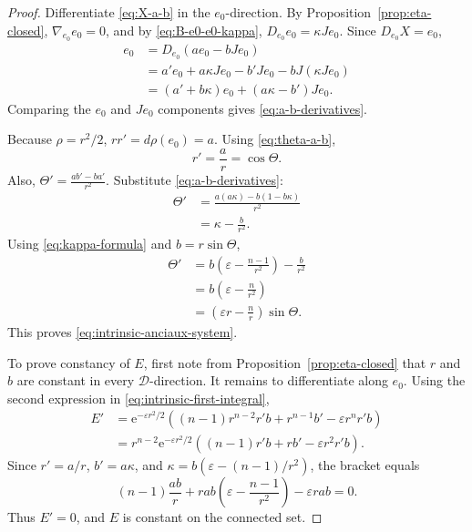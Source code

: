 \documentclass[11pt,a4paper]{article}
\numberwithin{equation}{section}
\newcommand{\Dcal}{\mathcal D}
\newcommand{\ee}{\mathrm e}
\begin{document}
\begin{proof}
Differentiate \eqref{eq:X-a-b} in the $e_0$-direction.  By Proposition~\ref{prop:eta-closed}, $\nabla_{e_0}e_0=0$, and by \eqref{eq:B-e0-e0-kappa},
$D_{e_0}e_0=\kappa Je_0.$
Since $D_{e_0}X=e_0$,
$$
\begin{aligned}
        e_0
        &=D_{e_0}(a e_0-bJe_0)\\
        &=a'e_0+a\kappa Je_0-b'Je_0-bJ(\kappa Je_0)\\
        &=(a'+b\kappa)e_0+(a\kappa-b')Je_0.
\end{aligned}
$$
Comparing the $e_0$ and $Je_0$ components gives \eqref{eq:a-b-derivatives}.

Because $\rho=r^2/2$,
$rr'=d\rho(e_0)=a.$
Using \eqref{eq:theta-a-b},
\begin{equation*}
        r'=\frac ar=\cos\Theta.
\end{equation*}
Also,
$\Theta'=\frac{ab'-ba'}{r^2}.$
Substitute \eqref{eq:a-b-derivatives}:
$$
\begin{aligned}
        \Theta'
        &=\frac{a(a\kappa)-b(1-b\kappa)}{r^2}\\
        &=\kappa-\frac{b}{r^2}.
\end{aligned}
$$
Using \eqref{eq:kappa-formula} and $b=r\sin\Theta$,
$$
\begin{aligned}
        \Theta'
        &=b\left(\varepsilon-\frac{n-1}{r^2}\right)-\frac{b}{r^2}\\
        &=b\left(\varepsilon-\frac n{r^2}\right)\\
        &=\left(\varepsilon r-\frac nr\right)\sin\Theta.
\end{aligned}
$$
This proves \eqref{eq:intrinsic-anciaux-system}.

To prove constancy of $E$, first note from Proposition~\ref{prop:eta-closed} that $r$ and $b$ are constant in every $\Dcal$-direction.  It remains to differentiate along $e_0$.  Using the second expression in \eqref{eq:intrinsic-first-integral},
$$
\begin{aligned}
        E'
        &=\ee^{-\varepsilon r^2/2}\left((n-1)r^{n-2}r'b+r^{n-1}b'-\varepsilon r^nr'b\right)\\
        &=r^{n-2}\ee^{-\varepsilon r^2/2}
          \left((n-1)r'b+rb'-\varepsilon r^2r'b\right).
\end{aligned}
$$
Since $r'=a/r$, $b'=a\kappa$, and
$\kappa=b(\varepsilon-(n-1)/r^2)$, the bracket equals
$$
        (n-1)\frac{ab}{r}
        +ra b\left(\varepsilon-\frac{n-1}{r^2}\right)
        -\varepsilon rab=0.
$$
Thus $E'=0$, and $E$ is constant on the connected set.
\end{proof}
\end{document}
